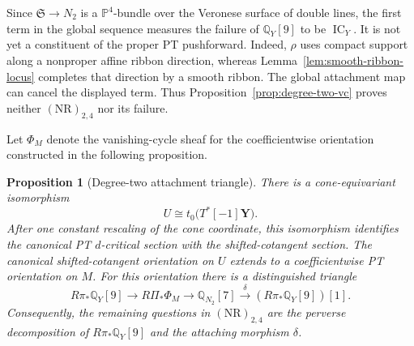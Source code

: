 \documentclass[11pt,reqno]{amsart}
\newtheorem{proposition}[theorem]{Proposition}
\theoremstyle{definition}
\newcommand{\Q}{\mathbb Q}
\newcommand{\Pp}{\mathbb P}
\newcommand{\IC}{\operatorname{IC}}
\begin{document}
Since $\mathfrak S\to N_2$ is a $\Pp^4$-bundle over the Veronese surface of
double lines, the first term in the global sequence measures the failure of
$\Q_Y[9]$ to be $\IC_Y$.  It is not yet a constituent of the proper PT
pushforward.  Indeed, $\rho$ uses compact support along a nonproper affine
ribbon direction, whereas Lemma~\ref{lem:smooth-ribbon-locus} completes that
direction by a smooth ribbon.  The global attachment map can cancel the
displayed term.  Thus Proposition~\ref{prop:degree-two-vc} proves neither
$(\mathrm{NR})_{2,4}$ nor its failure.

Let $\Phi_M$ denote the vanishing-cycle sheaf for the coefficientwise
orientation constructed in the following proposition.

\begin{proposition}[Degree-two attachment triangle]
\label{prop:degree-two-attachment}
There is a cone-equivariant isomorphism
\[
 U\cong t_0\bigl(T^*[-1]\mathbf Y\bigr).
\]
After one constant rescaling of the cone coordinate, this isomorphism
identifies the canonical PT $d$-critical section with the shifted-cotangent
section.  The canonical shifted-cotangent orientation on $U$ extends to a
coefficientwise PT orientation on $M$.  For this orientation there is a
distinguished triangle
\[
 R\pi_*\Q_Y[9]\longrightarrow R\Pi_*\Phi_M
 \longrightarrow\Q_{N_2}[7]
 \xrightarrow{\delta}(R\pi_*\Q_Y[9])[1].
\]
Consequently, the remaining questions in $(\mathrm{NR})_{2,4}$
are the perverse decomposition of $R\pi_*\Q_Y[9]$ and the attaching
morphism $\delta$.
\end{proposition}
\end{document}
